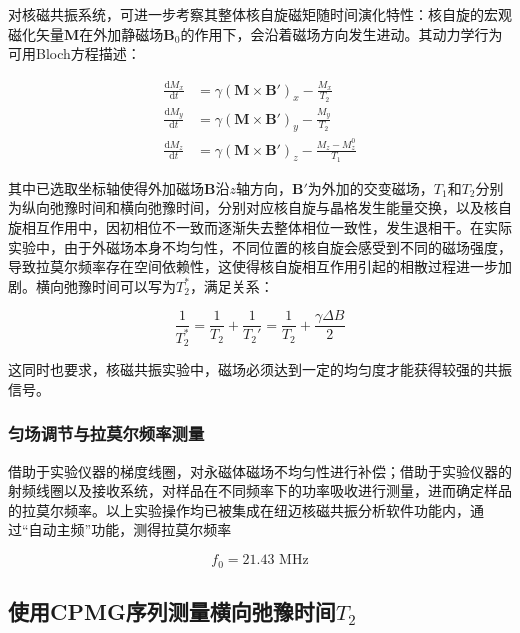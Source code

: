 \documentclass{thuemp}
\begin{document}
对核磁共振系统，可进一步考察其整体核自旋磁矩随时间演化特性：核自旋的宏观磁化矢量$\symbf{M}$在外加静磁场$\symbf{B}_0$的作用下，会沿着磁场方向发生进动。其动力学行为可用Bloch方程描述：

\begin{equation}
\begin{aligned}
    \frac{\mathrm{d} M_x}{\mathrm{d} t} &= \gamma (\symbf{M} \times \symbf{B'})_x - \frac{M_x}{T_2} \\
    \frac{\mathrm{d} M_y}{\mathrm{d} t} &= \gamma (\symbf{M} \times \symbf{B'})_y - \frac{M_y}{T_2} \\
    \frac{\mathrm{d} M_z}{\mathrm{d} t} &= \gamma (\symbf{M} \times \symbf{B'})_z - \frac{M_z - M_z^0}{T_1}
\end{aligned}
\label{eq:bloch}
\end{equation}

其中已选取坐标轴使得外加磁场$\mathbf{B}$沿$z$轴方向，$\symbf{B'}$为外加的交变磁场，$T_1$和$T_2$分别为纵向弛豫时间和横向弛豫时间，分别对应核自旋与晶格发生能量交换，以及核自旋相互作用中，因初相位不一致而逐渐失去整体相位一致性，发生退相干。在实际实验中，由于外磁场本身不均匀性，不同位置的核自旋会感受到不同的磁场强度，导致拉莫尔频率存在空间依赖性，这使得核自旋相互作用引起的相散过程进一步加剧。横向弛豫时间可以写为$T_2^*$，满足关系：

\begin{equation}
\frac{1}{T_2^*} = \frac{1}{T_2} + \frac{1}{T_2'} = \frac{1}{T_2} + \frac{\gamma \Delta B}{2}
\end{equation}

这同时也要求，核磁共振实验中，磁场必须达到一定的均匀度才能获得较强的共振信号。

\subsubsection{匀场调节与拉莫尔频率测量}

借助于实验仪器的梯度线圈，对永磁体磁场不均匀性进行补偿；借助于实验仪器的射频线圈以及接收系统，对样品在不同频率下的功率吸收进行测量，进而确定样品的拉莫尔频率。以上实验操作均已被集成在纽迈核磁共振分析软件功能内，通过“自动主频”功能，测得拉莫尔频率

\begin{equation}
f_0 = 21.43 \text{ MHz}
\label{eq:lamor_freq}
\end{equation}

\subsection{使用CPMG序列测量横向弛豫时间$T_2$}  
\end{document}
